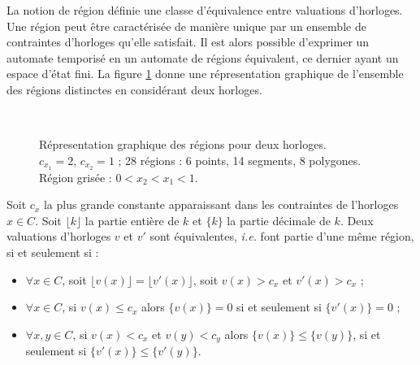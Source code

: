         La notion de région définie une classe d'équivalence entre valuations
        d'horloges. Une région peut être caractérisée de manière unique par un
        ensemble de contraintes d'horloges qu'elle satisfait. Il est alors
        possible d'exprimer un automate temporisé en un automate de régions
        équivalent, ce dernier ayant un espace d'état fini. La figure
        \ref{fig:graphe-regions} donne une répresentation graphique de
        l'ensemble des régions distinctes en considérant deux horloges.

        ~

        \begin{figure}[!ht]
          \centering
          \caption{Répresentation graphique des régions pour deux horloges. \\
            $c_{x_1} = 2$, $c_{x_2} = 1$ ; 28 régions : 6 points, 14 segments, 8
            polygones. \\ 
            Région grisée : $0 < x_2 < x_1 < 1$.}
          \label{fig:graphe-regions}
        \end{figure}

        Soit $c_x$ la plus grande constante apparaissant dans les contraintes de
        l'horloges $x \in C$. Soit $\lfloor k \rfloor$ la partie entière de $k$
        et $\{k\}$ la partie décimale de $k$. Deux valuations d'horloges $v$ et
        $v'$ sont équivalentes, {\it i.e.} font partie d'une même région, si et
        seulement si :

        \begin{itemize}
          \item $\forall x \in C$, soit $\lfloor v(x) \rfloor = \lfloor v'(x)
            \rfloor$, soit $v(x) > c_x$ et $v'(x) > c_x$ ;
          \item $\forall x \in C$, si $v(x) \le c_x$ alors $\{v(x)\} = 0$ si et
            seulement si $\{v'(x)\} = 0$ ;
          \item $\forall x, y \in C$, si $v(x) < c_x$ et $v(y) < c_y$ alors
            $\{v(x)\} \le \{v(y)\}$, si et seulement si $\{v'(x)\} \le
            \{v'(y)\}$.
        \end{itemize}


